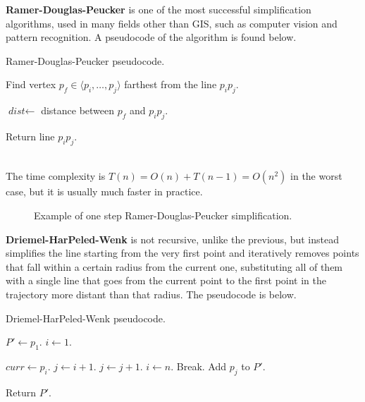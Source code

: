 \textbf{Ramer-Douglas-Peucker} is one of the most successful simplification algorithms, used in many fields other than GIS, such as computer vision and pattern recognition. A pseudocode of the algorithm is found below.
\begin{algorithm}
\caption{Ramer-Douglas-Peucker pseudocode.} 
\begin{algorithmic}[1]
     
    
    \State Find vertex $p_f \in \langle p_i, \dots, p_j \rangle$ farthest from the line $p_i p_j$.
        
    \State $\textit{dist} \gets$ distance between $p_f$ and $p_i p_j$.

        \State {}
        \State {}
    \EndIf

    \State Return line $p_i p_j$.
    \EndFunction
\end{algorithmic}
\end{algorithm} \\
The time complexity is $T(n) = O(n) + T(n-1) = O(n^2)$ in the worst case, but it is usually much faster in practice.
\begin{figure}[!ht]
    \centering
    
    \caption{Example of one step Ramer-Douglas-Peucker simplification.}
    \label{fig:ramer-douglas-peucker}
\end{figure}


\textbf{Driemel-HarPeled-Wenk} is not recursive, unlike the previous, but instead simplifies the line starting from the very first point and iteratively removes points that fall within a certain radius from the current one, substituting all of them with a single line that goes from the current point to the first point in the trajectory more distant than that radius. The pseudocode is below.
\begin{algorithm}
\caption{Driemel-HarPeled-Wenk pseudocode.}
\begin{algorithmic}[1]
     
    
    \State $P' \gets p_1$.
    \State $i \gets 1$.
    
        \State $\textit{curr} \gets p_i$.
        \State $j \gets i+1$.
            \State $j \gets j+1$.
                \State $i \gets n$.
                \State Break. 
            \EndIf
        \EndWhile
        \State Add $p_j$ to $P'$.
    \EndWhile

    \State Return $P'$.
    \EndFunction
\end{algorithmic}
\end{algorithm}

